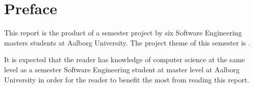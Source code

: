 \chapter*{Preface}
This report is the product of a  semester project by six Software Engineering masters students at Aalborg University. The project theme of this semester is \projecttheme.

It is expected that the reader has knowledge of computer science at the same level as a  semester Software Engineering student at master level at Aalborg University in order for the reader to benefit the most from reading this report.